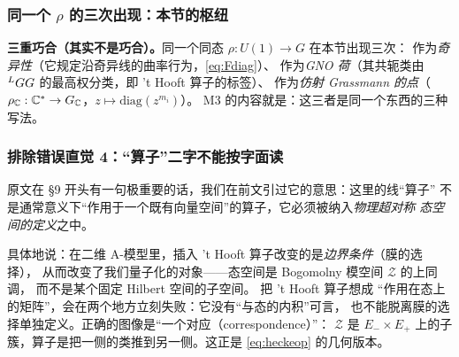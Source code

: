 \subsubsection{同一个 $\rho$ 的三次出现：本节的枢纽}

\begin{keyidea}
\textbf{三重巧合（其实不是巧合）。}同一个同态 $\rho:U(1)\to G$ 在本节出现三次：
作为\emph{奇异性}（它规定沿奇异线的曲率行为，\eqref{eq:Fdiag}）、
作为\emph{GNO 荷}（其共轭类由 ${}^{L}G G$ 的最高权分类，即 't Hooft{} 算子的标签）、
作为\emph{仿射 Grassmann 的点}（$\rho_{\mathbb{C}}:\mathbb{C}^*\to G_{\mathbb{C}}$，$z\mapsto\mathrm{diag}(z^{m_i})$）。
M3 的内容就是：这三者是同一个东西的三种写法。\pA{}
\end{keyidea}

\subsubsection{排除错误直觉 4：“算子”二字不能按字面读}

原文在 §9 开头有一句极重要的话，我们在前文引过它的意思：这里的线“算子”
不是通常意义下“作用于一个既有向量空间”的算子，它必须被纳入\emph{物理超对称
态空间的定义}之中。\pA{}

具体地说：在二维 A-模型里，插入 't Hooft{} 算子改变的是\emph{边界条件}（膜的选择），
从而改变了我们量子化的对象——态空间是 Bogomolny 模空间 $\mathcal{Z}$ 的上同调，
而不是某个固定 Hilbert 空间的子空间。\pA{} 把 't Hooft{} 算子想成
“作用在态上的矩阵”，会在两个地方立刻失败：它没有“与态的内积”可言，
也不能脱离膜的选择单独定义。正确的图像是“一个对应（correspondence）”：
$\mathcal{Z}$ 是 $E_-\times E_+$ 上的子簇，算子是把一侧的类推到另一侧。这正是
\eqref{eq:heckeop} 的几何版本。\pB{}

